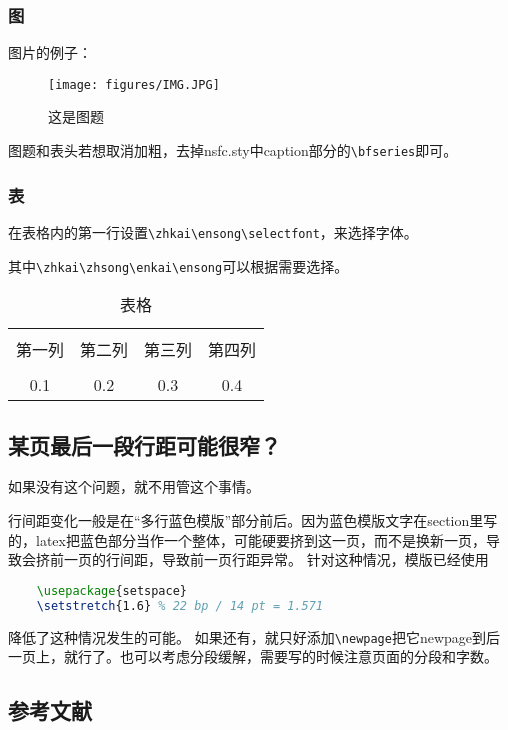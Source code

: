 \subsubsection{图}
图片的例子：
\begin{figure}[h!]
\centering %
\texttt{[image: figures/IMG.JPG]}
\captionsetup{justification=centering} %
\caption{这是图题}
\end{figure}

图题和表头若想取消加粗，去掉nsfc.sty中caption部分的\verb|\bfseries|即可。


\subsubsection{表}
在表格内的第一行设置\verb|\zhkai\ensong\selectfont|，来选择字体。

其中\verb|\zhkai\zhsong\enkai\ensong|可以根据需要选择。
\begin{table}[htbp]
	\zhkai\ensong\selectfont%
	\centering  %
	\caption{表格}  %
	\label{table1}  %
	\begin{tabular}{|c|c|c|c|}  
		\hline  %
		& & & \\[-6pt]  %
		第一列&第二列&第三列&第四列 \\  %
		\hline
		& & & \\[-6pt]  %
		0.1&0.2&0.3&0.4 \\
		\hline
	\end{tabular}
\end{table}

\subsection{某页最后一段行距可能很窄？}
如果没有这个问题，就不用管这个事情。

行间距变化一般是在“多行蓝色模版”部分前后。因为蓝色模版文字在section里写的，latex把蓝色部分当作一个整体，可能硬要挤到这一页，而不是换新一页，导致会挤前一页的行间距，导致前一页行距异常。
针对这种情况，模版已经使用
\begin{lstlisting}[language=tex, basicstyle=\ttfamily\small, keywordstyle=\color{blue}, commentstyle=\color{gray}]
	%自动段落的行间距微调
	\usepackage{setspace}
	\setstretch{1.6} % 22 bp / 14 pt = 1.571
\end{lstlisting}
降低了这种情况发生的可能。
如果还有，就只好添加\verb|\newpage|把它newpage到后一页上，就行了。也可以考虑分段缓解，需要写的时候注意页面的分段和字数。

\begin{REF}
\subsection*{参考文献}
\vspace{-50pt}

\end{REF}

\newpage%
